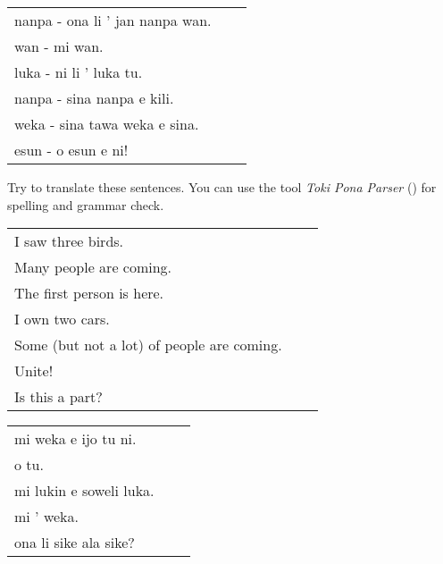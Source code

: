 \begin{supertabular}{p{5,5cm}|ll}
    nanpa - ona li ' jan nanpa wan. &  & \\ %
    wan - mi wan.                   &  & \\ %
    luka - ni li ' luka tu.         &  & \\ %
    nanpa - sina nanpa e kili.      &  & \\ %
    weka - sina tawa weka e sina.   &  & \\ %
    esun - o esun e ni!             &  & \\ %
\end{supertabular}

Try to translate these sentences.
You can use the tool \textit{Toki Pona Parser} (\cite{www:rowa:02}) for spelling and grammar check.

\begin{supertabular}{p{5,5cm}|ll}
    I saw three birds.                         &  & \\ %
    Many people are coming.                    &  & \\   %
    The first person is here.                  &  & \\   %
    I own two cars.                            &  & \\ %
    Some (but not a lot) of people are coming. &  & \\  %
    Unite!                                     &  & \\ %
    Is this a part?                            &  & \\ %
\end{supertabular}

\begin{supertabular}{p{5,5cm}|ll}
    mi weka e ijo tu ni.    &  & \\ %
    o tu.                   &  & \\ %
    mi lukin e soweli luka. &  & \\   %
    mi ' weka.              &  & \\ %
    ona li sike ala sike?   &  & \\ %
\end{supertabular}
